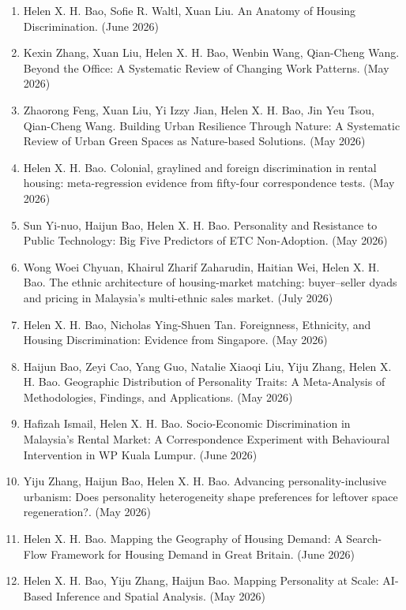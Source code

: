 \documentclass[10pt,a4paper]{article}
\providecommand{\tightlist}{%
  \setlength{\itemsep}{2pt}\setlength{\parskip}{0pt}}
\begin{document}
\begin{enumerate}
\def\labelenumi{\arabic{enumi}.}
\tightlist
\item
  Helen X. H. Bao, Sofie R. Waltl, Xuan Liu. An Anatomy of Housing
  Discrimination. (June 2026)
\item
  Kexin Zhang, Xuan Liu, Helen X. H. Bao, Wenbin Wang, Qian-Cheng Wang.
  Beyond the Office: A Systematic Review of Changing Work Patterns. (May
  2026)
\item
  Zhaorong Feng, Xuan Liu, Yi Izzy Jian, Helen X. H. Bao, Jin Yeu Tsou,
  Qian-Cheng Wang. Building Urban Resilience Through Nature: A
  Systematic Review of Urban Green Spaces as Nature-based Solutions.
  (May 2026)
\item
  Helen X. H. Bao. Colonial, graylined and foreign discrimination in
  rental housing: meta-regression evidence from fifty-four
  correspondence tests. (May 2026)
\item
  Sun Yi-nuo, Haijun Bao, Helen X. H. Bao. Personality and Resistance to
  Public Technology: Big Five Predictors of ETC Non-Adoption. (May 2026)
\item
  Wong Woei Chyuan, Khairul Zharif Zaharudin, Haitian Wei, Helen X. H.
  Bao. The ethnic architecture of housing-market matching: buyer--seller
  dyads and pricing in Malaysia's multi-ethnic sales market. (July 2026)
\item
  Helen X. H. Bao, Nicholas Ying-Shuen Tan. Foreignness, Ethnicity, and
  Housing Discrimination: Evidence from Singapore. (May 2026)
\item
  Haijun Bao, Zeyi Cao, Yang Guo, Natalie Xiaoqi Liu, Yiju Zhang, Helen
  X. H. Bao. Geographic Distribution of Personality Traits: A
  Meta-Analysis of Methodologies, Findings, and Applications. (May 2026)
\item
  Hafizah Ismail, Helen X. H. Bao. Socio-Economic Discrimination in
  Malaysia's Rental Market: A Correspondence Experiment with Behavioural
  Intervention in WP Kuala Lumpur. (June 2026)
\item
  Yiju Zhang, Haijun Bao, Helen X. H. Bao. Advancing
  personality-inclusive urbanism: Does personality heterogeneity shape
  preferences for leftover space regeneration?. (May 2026)
\item
  Helen X. H. Bao. Mapping the Geography of Housing Demand: A
  Search-Flow Framework for Housing Demand in Great Britain. (June 2026)
\item
  Helen X. H. Bao, Yiju Zhang, Haijun Bao. Mapping Personality at Scale:
  AI-Based Inference and Spatial Analysis. (May 2026)

\end{enumerate}
\end{document}
